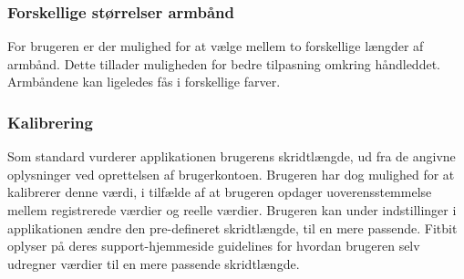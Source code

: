\subsubsection{Forskellige størrelser armbånd}
For brugeren er der mulighed for at vælge mellem to forskellige længder af armbånd. Dette tillader muligheden for bedre tilpasning omkring håndleddet. Armbåndene kan ligeledes fås i forskellige farver. %

\subsubsection{Kalibrering}
Som standard vurderer applikationen brugerens skridtlængde, ud fra de angivne oplysninger ved oprettelsen af brugerkontoen. Brugeren har dog mulighed for at kalibrerer denne værdi, i tilfælde af at brugeren opdager uoverensstemmelse mellem registrerede værdier og reelle værdier. Brugeren kan under indstillinger i applikationen ændre den pre-defineret skridtlængde, til en mere passende. Fitbit oplyser på deres support-hjemmeside guidelines for hvordan brugeren selv udregner værdier til en mere passende skridtlængde.   


